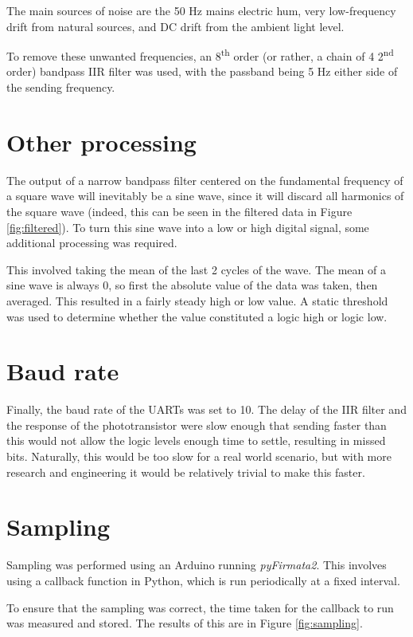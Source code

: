 \documentclass{article}
\begin{document}
\begin{multicols}{2}
The main sources of noise are the 50 Hz mains electric hum, very low-frequency drift from natural sources, and DC drift from the ambient light level. 

To remove these unwanted frequencies, an 8\textsuperscript{th} order (or rather, a chain of 4 2\textsuperscript{nd} order) bandpass IIR filter was used, with the passband being 5 Hz either side of the sending frequency. 

\section{Other processing}
The output of a narrow bandpass filter centered on the fundamental frequency of a square wave will inevitably be a sine wave, since it will discard all harmonics of the square wave (indeed, this can be seen in the filtered data in Figure \ref{fig:filtered}). To turn this sine wave into a low or high digital signal, some additional processing was required. 

This involved taking the mean of the last 2 cycles of the wave. The mean of a sine wave is always 0, so first the absolute value of the data was taken, then averaged. This resulted in a fairly steady high or low value. A static threshold was used to determine whether the value constituted a logic high or logic low.

\section{Baud rate}
Finally, the baud rate of the UARTs was set to 10. The delay of the IIR filter and the response of the phototransistor were slow enough that sending faster than this would not allow the logic levels enough time to settle, resulting in missed bits. Naturally, this would be too slow for a real world scenario, but with more research and engineering it would be relatively trivial to make this faster. 

\section{Sampling}
Sampling was performed using an Arduino running \textit{pyFirmata2}. This involves using a callback function in Python, which is run periodically at a fixed interval. 

To ensure that the sampling was correct, the time taken for the callback to run was measured and stored. The results of this are in Figure \ref{fig:sampling}. 


\end{multicols}
\end{document}
